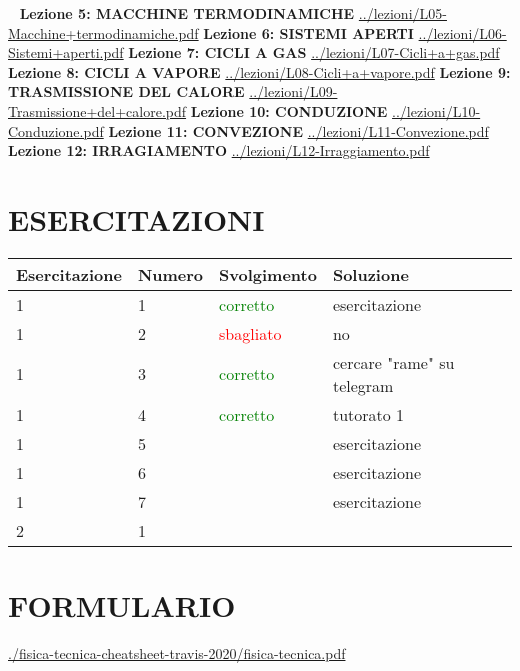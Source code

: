 \documentclass[a4paper, 9pt]{article}
\begin{document}
    \ \newline
    \newline
    \textbf{Lezione 5: MACCHINE TERMODINAMICHE}\newline
    \url{../lezioni/L05-Macchine+termodinamiche.pdf}
    \newline
    \newline
    \textbf{Lezione 6: SISTEMI APERTI}\newline
    \url{../lezioni/L06-Sistemi+aperti.pdf}
    \newline
    \newline
    \textbf{Lezione 7: CICLI A GAS}\newline
    \url{../lezioni/L07-Cicli+a+gas.pdf}
    \newline
    \newline
    \textbf{Lezione 8: CICLI A VAPORE}\newline
    \url{../lezioni/L08-Cicli+a+vapore.pdf}
    \newline
    \newline
    \textbf{Lezione 9: TRASMISSIONE DEL CALORE}\newline
    \url{../lezioni/L09-Trasmissione+del+calore.pdf}
    \newline
    \newline
    \textbf{Lezione 10: CONDUZIONE}\newline
    \url{../lezioni/L10-Conduzione.pdf}
    \newline
    \newline
    \textbf{Lezione 11: CONVEZIONE}\newline
    \url{../lezioni/L11-Convezione.pdf}
    \newline
    \newline
    \textbf{Lezione 12: IRRAGIAMENTO}\newline
    \url{../lezioni/L12-Irraggiamento.pdf}
    \newpage
    \section{ESERCITAZIONI}
    \begin{tabular}{llll}
        \textbf{Esercitazione} & \textbf{Numero} & \textbf{Svolgimento} & \textbf{Soluzione}\\
        \hline
        1 & 1 & \textcolor{green}{corretto} & esercitazione\\
        1 & 2 & \textcolor{red}{sbagliato} & no\\
        1 & 3 & \textcolor{green}{corretto} & cercare "rame" su telegram\\
        1 & 4 & \textcolor{green}{corretto} & tutorato 1\\
        1 & 5 &  & esercitazione\\
        1 & 6 &  & esercitazione\\
        1 & 7 &  & esercitazione\\
        \hline
        2 & 1 & & \\
    \end{tabular}
    \newpage
    \section{FORMULARIO}
    \url{./fisica-tecnica-cheatsheet-travis-2020/fisica-tecnica.pdf}
\end{document}
